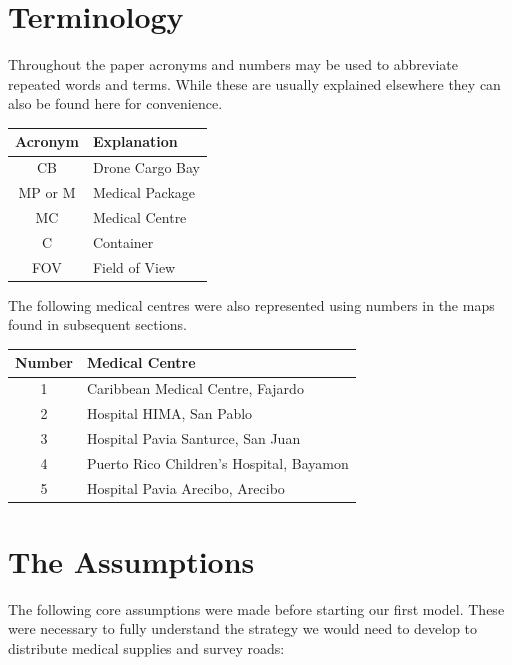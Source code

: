 \documentclass[a4paper,12pt]{article}
\begin{document}
\section{Terminology}
Throughout the paper acronyms and numbers may be used to abbreviate repeated words and terms. While these are usually explained elsewhere they can also be found here for convenience.

\begin{center}
\begin{tabular}{ |c|l| }
\hline
 \bf{Acronym} & \bf{Explanation}  \\\hline
 CB & Drone Cargo Bay \\
 MP or M & Medical Package \\
 MC & Medical Centre\\
 C & Container \\
 FOV & Field of View \\
 \hline
\end{tabular}
\end{center}
The following medical centres were also represented using numbers in the maps found in subsequent sections.

\begin{center}
\begin{tabular}{ |c|l| }
 \hline
 Number & Medical Centre  \\\hline
 1 & Caribbean Medical Centre, Fajardo \\
 2 & Hospital HIMA, San Pablo \\
 3 & Hospital Pavia Santurce, San Juan \\
 4 & Puerto Rico Children's Hospital, Bayamon \\
 5 & Hospital Pavia Arecibo, Arecibo  \\
 \hline
\end{tabular}
\end{center}

\section{The Assumptions}
The following core assumptions were made before starting our first model. These were necessary to fully understand the strategy we would
need to develop to distribute medical supplies and survey roads:
\end{document}

